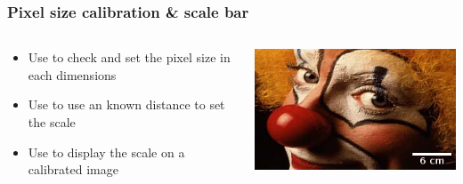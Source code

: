 \documentclass[ignorenonframetext,aspectratio=169,10pt,xcolor=table]{beamer}
\begin{document}
\begin{frame} \frametitle{Pixel size calibration \& scale bar}
  \begin{columns}
    \begin{column}{0.5\textwidth}
      \begin{itemize}
      \item Use  to check and set the
        pixel size in each dimensions
      \item Use  to use an known distance
        to set the scale
      \item Use  to display the scale on
        a calibrated image
      \end{itemize}
    \end{column}
    \begin{column}{0.5\textwidth}
      \includegraphics[width=\textwidth]{clown-scale}
    \end{column}
  \end{columns}

\end{frame}
\end{document}
